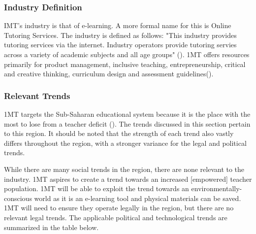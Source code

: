 \documentclass[letterpaper]{article}
\begin{document}
        \subsubsection{Industry Definition}
            
            IMT's industry is that of e-learning. A more formal name for this is Online Tutoring Services. The industry is defined as follows: "This industry provides tutoring services via the internet. Industry operators provide tutoring servies across a variety of academic subjects and all age groups" (\cite{industrydef}). 1MT offers resources primarily for product management, inclusive teaching, entrepreneurship, critical and creative thinking, curriculum design and assessment guidelines(\cite{companysite-programs}).

        \subsubsection{Relevant Trends}

            1MT targets the Sub-Saharan educational system because it is the place with the most to lose from a teacher deficit (\cite{companysite-about}). The trends discussed in this section pertain to this region. It should be noted that the strength of each trend also vastly differs throughout the region, with a stronger variance for the legal and political trends.

            While there are many social trends in the region, there are none relevant to the industry. 1MT aspires to create a trend towards an increased [empowered] teacher population. 1MT will be able to exploit the trend towards an environmentally-conscious world as it is an e-learning tool and physical materials can be saved. 1MT will need to ensure they operate legally in the region, but there are no relevant legal trends. The applicable political and technological trends are summarized in the table below. 
            
\end{document}
